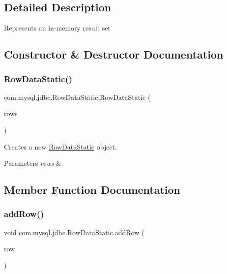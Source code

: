 \subsection{Detailed Description}
Represents an in-\/memory result set 

\subsection{Constructor \& Destructor Documentation}
\mbox{\label{classcom_1_1mysql_1_1jdbc_1_1_row_data_static_ab6e9d67d17a82c44e72d8b47bf85f2a0}} 
\subsubsection{\texorpdfstring{Row\+Data\+Static()}{RowDataStatic()}}
{\footnotesize\ttfamily com.\+mysql.\+jdbc.\+Row\+Data\+Static.\+Row\+Data\+Static (\begin{DoxyParamCaption}\item[{List$<$ \mbox{\hyperlink{classcom_1_1mysql_1_1jdbc_1_1_result_set_row}{Result\+Set\+Row}} $>$}]{rows }\end{DoxyParamCaption})}

Creates a new \mbox{\hyperlink{classcom_1_1mysql_1_1jdbc_1_1_row_data_static}{Row\+Data\+Static}} object.


\begin{DoxyParams}{Parameters}
{\em rows} & \\
\hline
\end{DoxyParams}


\subsection{Member Function Documentation}
\mbox{\label{classcom_1_1mysql_1_1jdbc_1_1_row_data_static_aa873d9a679baca7346e37b4c60b5ab52}} 
\subsubsection{\texorpdfstring{add\+Row()}{addRow()}}
{\footnotesize\ttfamily void com.\+mysql.\+jdbc.\+Row\+Data\+Static.\+add\+Row (\begin{DoxyParamCaption}\item[{\mbox{\hyperlink{classcom_1_1mysql_1_1jdbc_1_1_result_set_row}{Result\+Set\+Row}}}]{row }\end{DoxyParamCaption})}

